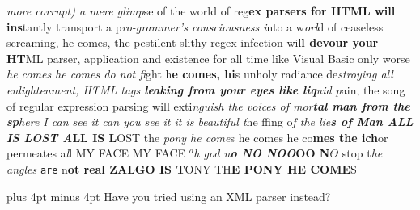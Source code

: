 \raggedright{}{\it more corrupt) a mere glimp}se
of the world of reg{\bf ex parsers for HTML will ins}tantly transport a
p{\it ro-grammer's consciousness i}nto a w{\it orl}d of ceaseless screaming, he
comes\strike{7em}, the pestilent slithy
regex-infection wil{\bf l devour your HT}ML
parser, application and existence for all time like Visual Basic only
worse {\it he comes he comes do not fi}ght
h{\bf e comes, hi}s unholy radiance
de{\it stroying all enlightenment, HTML tags 
{\bf leaking from your eyes like
liq}uid p}ain, the song of regular expre\strike{6em}ssion parsing will
exti{\it nguish
the voices of mor{\bf tal man from the sp}here
I can see it can you see it
it is beautiful t}he
f\thinspace{}\thinspace{}fing o{\it f the 
lie{\bf s of Man ALL IS LOST A}}{\bf LL IS L}OST
the {\it pony he come}s 
he com\strike{5.1em}es he co{\bf mes the ich}or
permeates a{\it l}l MY
FACE MY FACE $^o${\it h god n{\bf o NO NOO}}{\bf OO N}$\Theta$ 
stop t{\sl he angles}\graybox{2.5em} {\tt are} n{\bf ot real ZALGO IS T}ONY
TH{\bf E PONY HE COME}S

\parskip 10pt plus 4pt minus 4pt\parindent=0pt%
Have you tried using an XML parser instead?

\bye
